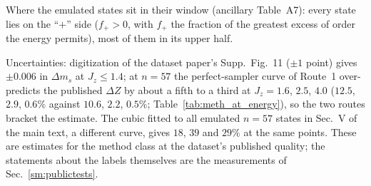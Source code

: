 \documentclass[aps,prx,onecolumn,10pt,nofootinbib,longbibliography,floatfix]{revtex4-2}
\theoremstyle{remark}
\newcommand{\Jz}{J_z}
\newcommand{\ms}{m_s}
\begin{document}
\def\SMcap{Route 2: the bias from the dataset paper's own unsigned $\langle Z_i\rangle$ error, $\Delta\ms=k\,\Delta %
Z$, with the slope $k$ (value and low--high range) of all emulated states at that point and \emph{with their sign},
which is assumed, not measured, for the dataset; every emulated state
over-orders, and $k$ is constant to $\pm0.5\,\%$. Also given: the reference $\ms$ and the energy ratio at which the %
perfect-sampler curve would reach this bias (``---'': no curve at that point). This is the only route at the
out-of-distribution points ($\Jz\le1.4$).}\def\SMlab{tab:meth_dz_matched} %


\noindent Where the emulated states sit in their window (ancillary Table~A7): every state lies on the ``$+$'' side %
($f_+>0$, with $f_+$ the fraction of the greatest excess of order the energy permits), most of them in its upper half. %

\noindent Uncertainties: digitization of the dataset paper's Supp.\ Fig.~11 ($\pm1$ point) gives $\pm0.006$ in %
$\Delta\ms$ at $\Jz\le1.4$; at $n=57$ the perfect-sampler curve of Route~1 over-predicts the published $\Delta Z$ by %
about a fifth to a third at $\Jz=1.6$, $2.5$, $4.0$ ($12.5$, $2.9$, $0.6\%$ against $10.6$, $2.2$, $0.5\%$; %
Table~\ref{tab:meth_at_energy}), so the two routes bracket the estimate. The cubic fitted to all emulated $n=57$ states
in Sec.~V of the main text, a different curve, gives $18$, $39$ and $29\%$ at the same points. These are estimates for the method %
class at the dataset's published quality; the statements about the labels themselves are the measurements of
Sec.~\ref{sm:publictests}.
\end{document}
